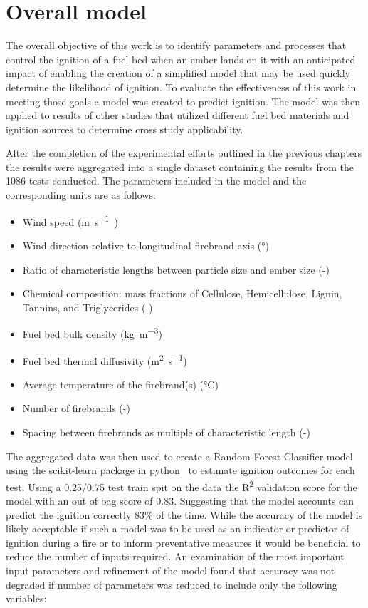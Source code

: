 \section{Overall model}
    The overall objective of this work is to identify parameters and processes that control the ignition of a fuel bed when an ember lands on it with an anticipated impact of enabling the creation of a simplified model that may be used quickly determine the likelihood of ignition. To evaluate the effectiveness of this work in meeting those goals a model was created to predict ignition. The model was then applied to results of other studies that utilized different fuel bed materials and ignition sources to determine cross study applicability.
    
    After the completion of the experimental efforts outlined in the previous chapters the results were aggregated into a single dataset containing the results from the 1086 tests conducted. The parameters included in the model and the corresponding units are as follows:
        \begin{itemize}
            \item Wind speed (\si{\meter\per\second)}
            \item Wind direction relative to longitudinal firebrand axis (\si{\degree})
            \item Ratio of characteristic lengths between particle size and ember size (-)
            \item Chemical composition: mass fractions of Cellulose, Hemicellulose, Lignin, Tannins, and Triglycerides (-)
            \item Fuel bed bulk density (\si{\kilo\gram\per\cubic\meter})
            \item Fuel bed thermal diffusivity (\si{\square\meter\per\second})
            \item Average temperature of the firebrand(s) (\si{\celsius})
            \item Number of firebrands (-)
            \item Spacing between firebrands as multiple of characteristic length (-)
        \end{itemize}
    The aggregated data was then used to create a Random Forest Classifier model using the scikit-learn package in python~\cite{scikit-learn} to estimate ignition outcomes for each test. Using a 0.25/0.75 test train spit on the data the R\textsuperscript{2} validation score for the model with an out of bag score of 0.83. Suggesting that the model accounts can predict the ignition correctly 83\% of the time. While the accuracy of the model is likely acceptable if such a model was to be used as an indicator or predictor of ignition during a fire or to inform preventative measures it would be beneficial to reduce the number of inputs required. An examination of the most important input parameters and refinement of the model found that accuracy was not degraded if number of parameters was reduced to include only the following variables:
